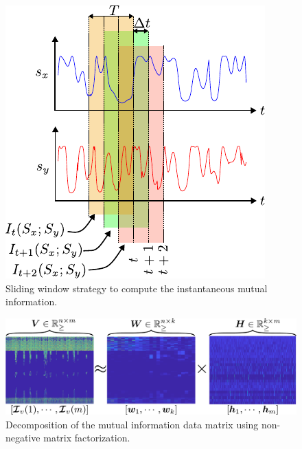 \begin{figure}[!th]
	\begin{center}
		\hspace*{\fill}
		\includegraphics[width=0.99\columnwidth]{sliding_window_mi.pdf}
		\hspace*{\fill}
	\end{center}
	\caption{\label{fig:mi_sliding_window_mi} Sliding window strategy to compute the instantaneous mutual information.}
\end{figure}

\begin{figure}[!th]
	\centering
	\includegraphics[width=0.99\columnwidth]{fig/nnmf_concept.pdf}
	\caption{Decomposition of the mutual information data matrix using non-negative matrix factorization.}
	\label{fig:nnmf}
\end{figure}

